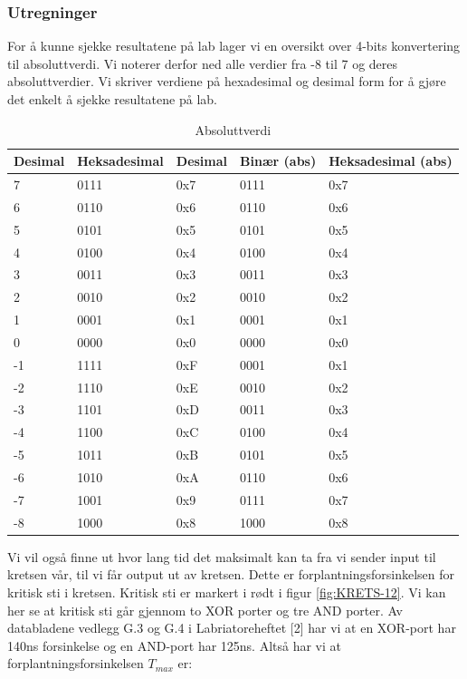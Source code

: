 \documentclass{article}
\begin{document}
\subsubsection{Utregninger} %
For å kunne sjekke resultatene på lab lager vi en oversikt over 4-bits konvertering til absoluttverdi. Vi noterer derfor ned alle verdier fra -8 til 7 og deres absoluttverdier. Vi skriver verdiene på hexadesimal og desimal form for å gjøre det enkelt å sjekke resultatene på lab.

\begin{table}[h]
	\centering
	\caption{Absoluttverdi}
	\label{tab:abs1}
	\vspace{0.2cm}
	\begin{tabular} {| l | l | l || l | l |} \hline
		Desimal & Heksadesimal & Desimal & Binær (abs) & Heksadesimal (abs) \\ \hline
		7 & 0111 & 0x7 & 0111 & 0x7 \\ \hline
		6 & 0110 & 0x6 & 0110 & 0x6 \\ \hline
		5 & 0101 & 0x5 & 0101 & 0x5 \\ \hline
		4 & 0100 & 0x4 & 0100 & 0x4 \\ \hline
		3 & 0011 & 0x3 & 0011 & 0x3 \\ \hline
		2 & 0010 & 0x2 & 0010 & 0x2 \\ \hline
		1 & 0001 & 0x1 & 0001 & 0x1 \\ \hline
		0 & 0000 & 0x0 & 0000 & 0x0 \\ \hline
		-1 & 1111 & 0xF & 0001 & 0x1 \\ \hline
		-2 & 1110 & 0xE & 0010 & 0x2 \\ \hline
		-3 & 1101 & 0xD & 0011 & 0x3 \\ \hline
		-4 & 1100 & 0xC & 0100 & 0x4 \\ \hline
		-5 & 1011 & 0xB & 0101 & 0x5 \\ \hline
		-6 & 1010 & 0xA & 0110 & 0x6 \\ \hline
		-7 & 1001 & 0x9 & 0111 & 0x7 \\ \hline
		-8 & 1000 & 0x8 & 1000 & 0x8 \\ \hline
	\end{tabular}
\end{table}

Vi vil også finne ut hvor lang tid det maksimalt kan ta fra vi sender input til kretsen vår, til vi får output ut av kretsen. Dette er forplantningsforsinkelsen for kritisk sti i kretsen. Kritisk sti er markert i rødt i figur \ref{fig:KRETS-12}. Vi kan her se at kritisk sti går gjennom to XOR porter og tre AND porter. Av databladene vedlegg G.3 og G.4 i Labriatoreheftet [2] har vi at en XOR-port har 140ns forsinkelse og en AND-port har 125ns. Altså har vi at forplantningsforsinkelsen \begin{math} T_{max} \end{math} er:
\end{document}
